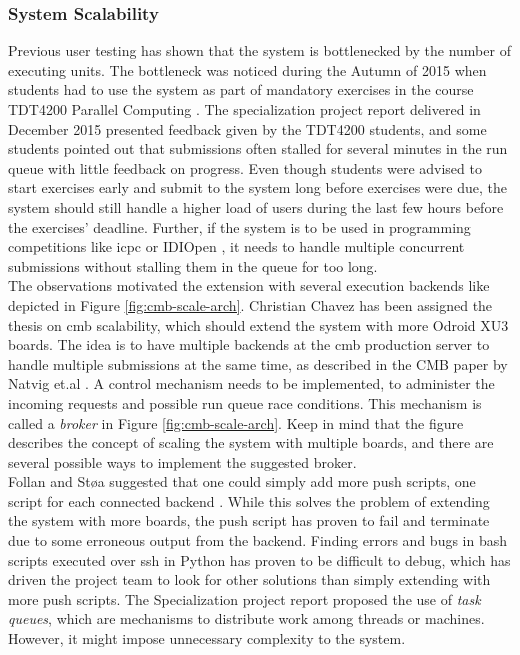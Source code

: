\subsubsection{System Scalability}
Previous user testing has shown that the system is bottlenecked by the number of executing units. The bottleneck was noticed during the Autumn of 2015 when students had to use the system as part of mandatory exercises in the course TDT4200 Parallel Computing \cite{TDT4200}. The specialization project report delivered in December 2015 presented feedback given by the TDT4200 students, and some students pointed out that submissions often stalled for several minutes in the run queue with little feedback on progress. Even though students were advised to start exercises early and submit to the system long before exercises were due, the system should still handle a higher load of users during the last few hours before the exercises' deadline. Further, if the system is to be used in programming competitions like \gls{icpc} \cite{ICPC} or IDIOpen \cite{IDIOPEN}, it needs to handle multiple concurrent submissions without stalling them in the queue for too long. \\

The observations motivated the extension with several execution backends like depicted in Figure \ref{fig:cmb-scale-arch}. Christian Chavez has been assigned the thesis on \gls{cmb} scalability, which should extend the system with more Odroid XU3 boards. The idea is to have multiple backends at the \gls{cmb} production server to handle multiple submissions at the same time, as described in the CMB paper by Natvig et.al \cite{a:CMB}. A control mechanism needs to be implemented, to administer the incoming requests and possible run queue race conditions. This mechanism is called a \textit{broker} in Figure \ref{fig:cmb-scale-arch}. Keep in mind that the figure describes the concept of scaling the system with multiple boards, and there are several possible ways to implement the suggested broker. \\

Follan and Støa suggested that one could simply add more push scripts, one script for each connected backend \cite{mt:T&S}. While this solves the problem of extending the system with more boards, the push script has proven to fail and terminate due to some erroneous output from the backend. Finding errors and bugs in bash scripts executed over \gls{ssh} in Python has proven to be difficult to debug, which has driven the project team to look for other solutions than simply extending with more push scripts. The Specialization project report proposed the use of \textit{task queues}, which are mechanisms to distribute work among threads or machines. However, it might impose unnecessary complexity to the system.  \\

